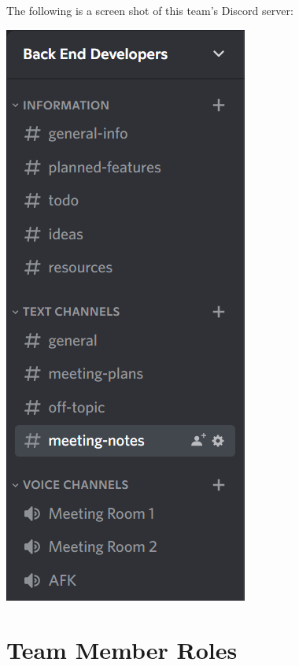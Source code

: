\documentclass[12pt]{article}
\begin{document}
The following is a screen shot of this team's Discord server:\\
\begin{center}
    \includegraphics{DiscordServer}
\end{center}

\section{Team Member Roles}
\end{document}
